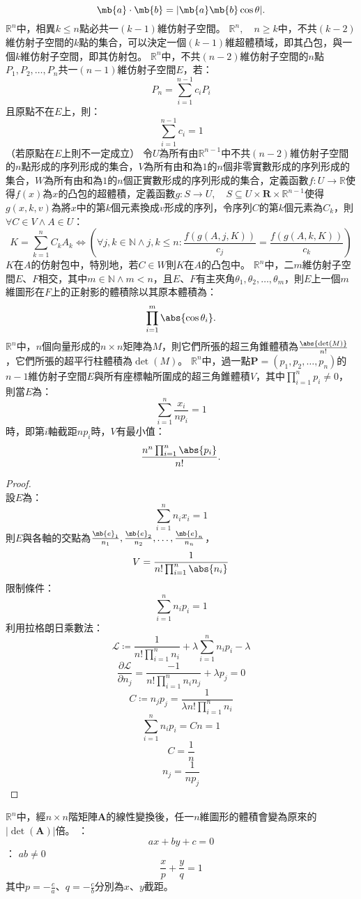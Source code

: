 \documentclass[a4paper,12pt]{report}
\begin{document}
\[\mb{a}\cdot\mb{b}=|\mb{a}\mb{b}\cos\theta|.\]
$\mathbb{R}^n$中，相異$k\leq n$點必共一$(k-1)$維仿射子空間。
$\mathbb{R}^n,\quad n\geq k$中，不共$(k-2)$維仿射子空間的$k$點的集合，可以決定一個$(k-1)$維超體積域，即其凸包，與一個$k$維仿射子空間，即其仿射包。
$\mathbb{R}^n$中，不共$(n-2)$維仿射子空間的$n$點$P_1,P_2,\ldots,P_n$共一$(n-1)$維仿射子空間$E$，若：
\[P_n=\sum_{i=1}^{n-1}c_iP_i\]
且原點不在$E$上，則：
\[\sum_{i=1}^{n-1}c_i=1\]
（若原點在$E$上則不一定成立）
令$U$為所有由$\mathbb{R}^{n-1}$中不共$(n-2)$維仿射子空間的$n$點形成的序列形成的集合，$V$為所有由和為$1$的$n$個非零實數形成的序列形成的集合，$W$為所有由和為$1$的$n$個正實數形成的序列形成的集合，定義函數$f\colon U\to\mathbb{R}$使得$f(x)$為$x$的凸包的超體積，定義函數$g\colon S\to U,\quad S\subseteq U\times\mathbf{R}\times\mathbb{R}^{n-1}$使得$g(x,k,v)$為將$x$中的第$k$個元素換成$v$形成的序列，令序列$C$的第$k$個元素為$C_k$，則$\forall C\in V\land A\in U$：
\[K=\sum_{k=1}^nC_kA_k\iff\left(\forall j,k\in\mathbb{N}\land j,k\leq n\colon\frac{f\left(g(A,j,K)\right)}{c_j}=\frac{f\left(g(A,k,K)\right)}{c_k}\right)\]
$K$在$A$的仿射包中，特別地，若$C\in W$則$K$在$A$的凸包中。
$\mathbb{R}^n$中，二$m$維仿射子空間$E$、$F$相交，其中$m\in\mathbb{N}\land m<n$，且$E$、$F$有主夾角$\theta_1,\theta_2,\ldots,\theta_m$，則$E$上一個$m$維圖形在$F$上的正射影的體積除以其原本體積為：
\[\prod_{i=1}^{m}\abs{\cos\theta_i}.\]
$\mathbb{R}^n$中，$n$個向量形成的$n\times n$矩陣為$M$，則它們所張的超三角錐體積為$\frac{\abs{\det(M)}}{n!}$，它們所張的超平行柱體積為$\det(M)$。
$\mathbb{R}^n$中，過一點$\mathbf{P}=(p_1,p_2,\ldots,p_n)$的$n-1$維仿射子空間$E$與所有座標軸所圍成的超三角錐體積$V$，其中$\prod_{i=1}^np_i\neq 0$，則當$E$為：
\[\sum_{i=1}^n\frac{x_i}{np_i}=1\]
時，即第$i$軸截距$np_i$時，$V$有最小值：
\[\frac{n^n\prod_{i=1}^n\abs{p_i}}{n!}.\]
\begin{proof}\mbox{}\\
設$E$為：
\[\sum_{i=1}^nn_ix_i=1\]
則$E$與各軸的交點為$\frac{\mb{e}_1}{n_1},\frac{\mb{e}_2}{n_2},\ldots,\frac{\mb{e}_n}{n_n}$，
\[V=\frac{1}{n!\prod_{i=1}^n\abs{n_i}}\]
限制條件：
\[\sum_{i=1}^nn_ip_i=1\]
利用拉格朗日乘數法：
\[\mathcal{L}\coloneq\frac{1}{n!\prod_{i=1}^nn_i}+\lambda\sum_{i=1}^nn_ip_i-\lambda\]
\[\frac{\partial\mathcal{L}}{\partial n_j}=\frac{-1}{n!\prod_{i=1}^nn_in_j}+\lambda p_j=0\]
\[C\coloneq n_jp_j=\frac{1}{\lambda  n!\prod_{i=1}^nn_i}\]
\[\sum_{i=1}^nn_ip_i=Cn=1\]
\[C=\frac{1}{n}\]
\[n_j=\frac{1}{np_j}\]
\end{proof}
$\mathbb{R}^n$中，經$n\times n$階矩陣$\mathbf{A}$的線性變換後，任一$n$維圖形的體積會變為原來的$|\det(\mathbf{A})|$倍。
：
\[ax+by+c=0\]
：
$ab\neq 0$
\[\frac{x}{p}+\frac{y}{q}=1\]
其中$p=-\frac{c}{a}$、$q=-\frac{c}{b}$分別為$x$、$y$截距。
\end{document}
